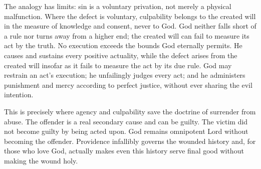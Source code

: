 The analogy has limits: sin is a voluntary privation, not merely a physical malfunction. Where the defect is voluntary, culpability belongs to the created will in the measure of knowledge and consent, never to God. God neither falls short of a rule nor turns away from a higher end; the created will can fail to measure its act by the truth. No execution exceeds the bounds God eternally permits. He causes and sustains every positive actuality, while the defect arises from the created will insofar as it fails to measure the act by its due rule. God may restrain an act's execution; he unfailingly judges every act; and he administers punishment and mercy according to perfect justice, without ever sharing the evil intention.

This is precisely where agency and culpability save the doctrine of surrender from abuse. The offender is a real secondary cause and can be guilty. The victim did not become guilty by being acted upon. God remains omnipotent Lord without becoming the offender. Providence infallibly governs the wounded history and, for those who love God, actually makes even this history serve final good without making the wound holy.
